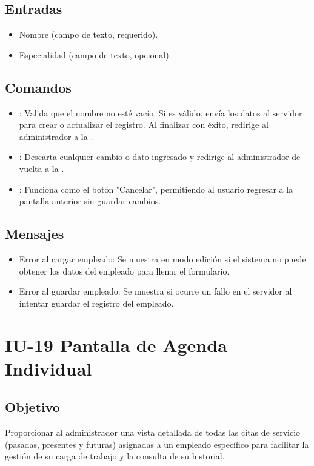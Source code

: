 \subsection{Entradas}
\begin{itemize}
    \item Nombre (campo de texto, requerido).
    \item Especialidad (campo de texto, opcional).
\end{itemize}

\subsection{Comandos}
\begin{itemize}
    \item {}: Valida que el nombre no esté vacío. Si es válido, envía los datos al servidor para crear o actualizar el registro. Al finalizar con éxito, redirige al administrador a la .
    \item {}: Descarta cualquier cambio o dato ingresado y redirige al administrador de vuelta a la .
    \item {}: Funciona como el botón "Cancelar", permitiendo al usuario regresar a la pantalla anterior sin guardar cambios.
\end{itemize}

\subsection{Mensajes}
\begin{itemize}
    \item Error al cargar empleado: Se muestra en modo edición si el sistema no puede obtener los datos del empleado para llenar el formulario.
    \item Error al guardar empleado: Se muestra si ocurre un fallo en el servidor al intentar guardar el registro del empleado.
\end{itemize}
\section{IU-19 Pantalla de Agenda Individual}

\subsection{Objetivo}
    Proporcionar al administrador una vista detallada de todas las citas de servicio (pasadas, presentes y futuras) asignadas a un empleado específico para facilitar la gestión de su carga de trabajo y la consulta de su historial.

